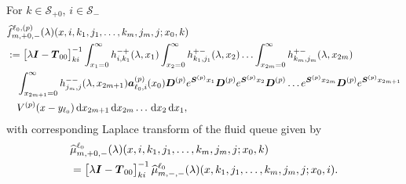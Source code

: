For \(k\in\mathcal S_{+0}\), \(i\in\mathcal S_-\)
\begin{align}
	&\widehat{f}_{m,+0,-}^{\ell_0,(p)}(\lambda)(x,i,k_1,j_1,\dots,k_{m},j_{m},j;x_0,k)\nonumber 
	\\&:=\begin{bmatrix} \lambda \boldsymbol I - \boldsymbol T_{00} \end{bmatrix}^{-1}_{ki}\int_{x_1=0}^\infty h^{-+}_{i,k_{1}}(\lambda,x_1)\nonumber
	\int_{x_2=0}^\infty h^{+-}_{k_1,j_1}(\lambda,x_2)
	\hdots \int_{x_{2m}=0}^\infty h^{+-}_{k_{m},j_{m}}(\lambda, x_{2m}) 
	\\&\quad \int_{x_{2m+1}=0}^\infty h^{--}_{j_{m},j}(\lambda,x_{2m+1})
	 \boldsymbol   a_{\ell_0,i}^{(p)}(x_0)\boldsymbol D^{(p)}e^{\boldsymbol{S}^{(p)}x_1} \boldsymbol{D}^{(p)} e^{\boldsymbol{S}^{(p)}x_2} \boldsymbol{D}^{(p)}\dots e^{\boldsymbol{S}^{(p)}x_{2m}}  \boldsymbol{D}^{(p)}e^{\boldsymbol{S}^{(p)}x_{2m+1}} \nonumber 
	 \\&\quad{} V^{(p)}(x-y_{\ell_0})  \, \mathrm{d} x_{2m+1} \, \mathrm{d} x_{2m}\dots\, \mathrm{d} x_2 \, \mathrm{d} x_1,\label{eqn: kvv0jJ0AfAAaAA}
\end{align}
with corresponding Laplace transform of the fluid queue given by 
\begin{align}
		&\widehat{\mu}_{m,+0,-}^{\ell_0}(\lambda)(x,i,k_1,j_1,\dots,k_{m},j_{m},j;x_0,k) \nonumber 
		\\&=\begin{bmatrix} \lambda \boldsymbol I - \boldsymbol T_{00} \end{bmatrix}^{-1}_{ki}\widehat{\mu}_{m,-,-}^{\ell_0}(\lambda)(x,k_1,j_1,\dots,k_{m},j_{m},j;x_0,i).
\end{align}  

